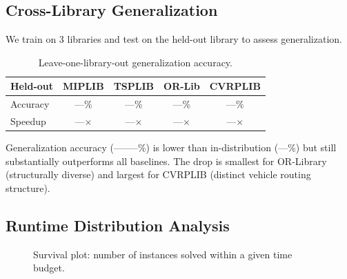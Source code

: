 \documentclass[11pt]{article}
\begin{document}
\subsection{Cross-Library Generalization}

We train on 3 libraries and test on the held-out library to assess generalization.

\begin{table}[t]
\centering
\caption{Leave-one-library-out generalization accuracy.}
\begin{tabular}{lcccc}
\toprule
\textbf{Held-out} & \textbf{MIPLIB} & \textbf{TSPLIB} & \textbf{OR-Lib} & \textbf{CVRPLIB} \\
\midrule
Accuracy & ---\% & ---\% & ---\% & ---\% \\
Speedup & ---$\times$ & ---$\times$ & ---$\times$ & ---$\times$ \\
\bottomrule
\end{tabular}
\end{table}

Generalization accuracy (--------\%) is lower than in-distribution (---\%) but still substantially outperforms all baselines. The drop is smallest for OR-Library (structurally diverse) and largest for CVRPLIB (distinct vehicle routing structure).

\subsection{Runtime Distribution Analysis}

\begin{figure}[t]
\centering
{}
\caption{Survival plot: number of instances solved within a given time budget.}
\end{figure}
\end{document}
